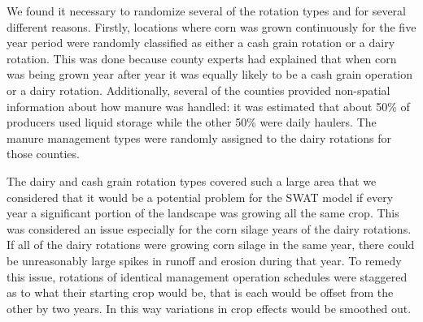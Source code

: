 
We found it necessary to randomize several of the rotation types and for several different reasons. Firstly, locations where corn was grown continuously for the five year period were randomly classified as either a cash grain rotation or a dairy rotation. This was done because county experts had explained that when corn was being grown year after year it was equally likely to be a cash grain operation or a dairy rotation. Additionally, several of the counties provided non-spatial information about how manure was handled: it was estimated that about 50\% of producers used liquid storage while the other 50\% were daily haulers. The manure management types were randomly assigned to the dairy rotations for those counties.  

The dairy and cash grain rotation types covered such a large area that we considered that it would be a potential problem for the SWAT model if every year a significant portion of the landscape was growing all the same crop. This was considered an issue especially for the corn silage years of the dairy rotations. If all of the dairy rotations were growing corn silage in the same year, there could be unreasonably large spikes in runoff and erosion during that year. To remedy this issue, rotations of identical management operation schedules were staggered as to what their starting crop would be, that is each would be offset from the other by two years. In this way variations in crop effects would be smoothed out.